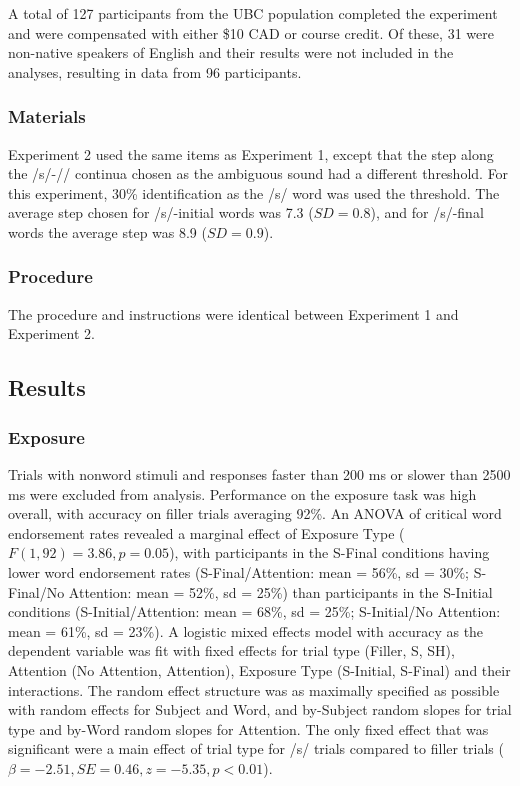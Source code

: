 A total of 127 participants from the UBC population completed the experiment and were compensated with either \$10 CAD or course credit.  Of these, 31 were non-native speakers of English and their results were not included in the analyses, resulting in data from 96 participants.

\subsubsection{Materials}

Experiment 2 used the same items as Experiment 1, except that the step along the /s/-/\textesh/ continua chosen as the ambiguous sound had a different threshold.  For this experiment, 30\% identification as the /s/ word was used the threshold. The average step chosen for /s/-initial words was 7.3 ($SD = 0.8$), and for /s/-final words the average step was 8.9 ($SD = 0.9$).

\subsubsection{Procedure}

The procedure and instructions were identical between Experiment 1 and Experiment 2.

\subsection{Results}

\subsubsection{Exposure}

Trials with nonword stimuli and responses faster than 200 ms or slower than 2500 ms were excluded from analysis. 
Performance on the exposure task was high overall, with accuracy on filler trials averaging 92\%.  
An ANOVA of critical word endorsement rates revealed a marginal effect of Exposure Type ($F(1,92) = 3.86, p = 0.05$), with participants in the S-Final conditions having lower word endorsement rates (S-Final/Attention: mean = 56\%, sd = 30\%; S-Final/No Attention: mean = 52\%, sd = 25\%) than participants in the S-Initial conditions (S-Initial/Attention: mean = 68\%, sd = 25\%; S-Initial/No Attention: mean = 61\%, sd = 23\%).
A logistic mixed effects model with accuracy as the dependent variable was fit with fixed effects for trial type (Filler, S, SH), Attention (No Attention, Attention), Exposure Type (S-Initial, S-Final) and their interactions. 
The random effect structure was as maximally specified as possible with random effects for Subject and Word, and by-Subject random slopes for trial type and by-Word random slopes for Attention. 
The only fixed effect that was significant were a main effect of trial type for /s/ trials compared to filler trials ($\beta = -2.51, SE = 0.46, z = -5.35, p < 0.01$).

